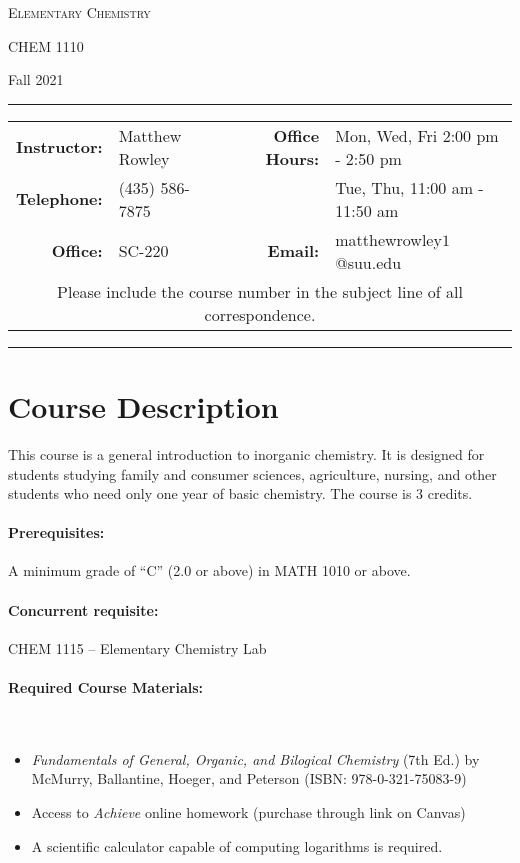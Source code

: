 \documentclass[12pt, letterpaper]{article}
\begin{document}
\begin{center}
	{\Large \textsc{Elementary Chemistry}}

	CHEM 1110
\end{center}
\begin{center}
	{\large Fall 2021}
\end{center}
\begin{center}
	\rule{\textwidth}{0.4pt}
	\begin{tabular}{rlcrl}
		\textbf{Instructor:} & Matthew Rowley & & \textbf{Office Hours:} & Mon, Wed, Fri 2:00 pm - 2:50 pm \\
		\textbf{Telephone:} & (435) 586-7875 & & & Tue, Thu, 11:00 am - 11:50 am\\
		\textbf{Office:} & SC-220 & & \textbf{Email:} & matthewrowley$1$@suu.edu\\
		\multicolumn{5}{c}{Please include the course number in the subject line of all correspondence.} 
	\end{tabular}
	\rule{\textwidth}{0.4pt}
\end{center}

\section*{Course Description} 
This course is a general introduction to inorganic chemistry. It is designed for students studying family and consumer sciences, agriculture, nursing, and other students who need only one year of basic chemistry. The course is 3 credits.

\paragraph{Prerequisites:}
A minimum grade of ``C'' (2.0 or above) in MATH 1010 or above.

\paragraph{Concurrent requisite:}
CHEM 1115 -- Elementary Chemistry Lab

\paragraph{Required Course Materials:} ~

\begin{itemize}
\item \emph{Fundamentals of General, Organic, and Bilogical Chemistry} (7th Ed.) by McMurry, Ballantine, Hoeger, and Peterson (ISBN: 978-0-321-75083-9)
\item Access to \emph{Achieve} online homework (purchase through link on Canvas) 
\item A scientific calculator capable of computing logarithms is required.
\end{itemize}
\end{document}
